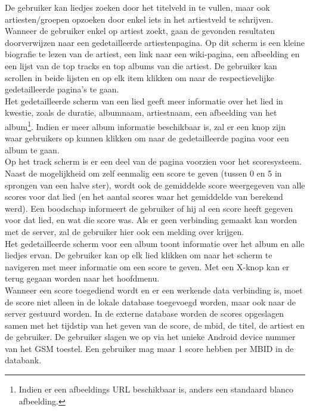 \documentclass[11pt,a4paper]{article}
\begin{document}
De gebruiker kan liedjes zoeken door het titelveld in te vullen, maar ook artiesten/groepen opzoeken door enkel iets in het artiestveld te schrijven. Wanneer de gebruiker enkel op artiest zoekt, gaan de gevonden resultaten doorverwijzen naar een gedetailleerde artiestenpagina. Op dit scherm is een kleine biografie te lezen van de artiest, een link naar een wiki-pagina, een afbeelding en een lijst van de top tracks en top albums van die artiest. De gebruiker kan scrollen in beide lijsten en op elk item klikken om naar de respectievelijke gedetailleerde pagina's te gaan.
\\

Het gedetailleerde scherm van een lied geeft meer informatie over het lied in kwestie, zoals de duratie, albumnaam, artiestnaam, een afbeelding van het album\footnote{Indien er een afbeeldings URL beschikbaar is, anders een standaard blanco afbeelding.}. Indien er meer album informatie beschikbaar is, zal er een knop zijn waar gebruikers op kunnen klikken om naar de gedetailleerde pagina voor een album te gaan. 
\\ 	

Op het track scherm is er een deel van de pagina voorzien voor het scoresysteem. Naast de mogelijkheid om zelf eenmalig een score te geven (tussen 0 en 5 in sprongen van een halve ster), wordt ook de gemiddelde score weergegeven van alle scores voor dat lied (en het aantal scores waar het gemiddelde van berekend werd). Een boodschap informeert de gebruiker of hij al een score heeft gegeven voor dat lied, en wat die score was. Als er geen verbinding gemaakt kan worden met de server, zal de gebruiker hier ook een melding over krijgen. 
\\ 
	
Het gedetailleerde scherm voor een album toont informatie over het album en alle liedjes ervan. De gebruiker kan op elk lied klikken om naar het scherm te navigeren met meer informatie om een score te geven. Met een X-knop kan er terug gegaan worden naar het hoofdmenu.
\\ 
	
Wanneer een score toegediend wordt en er een werkende data verbinding is, moet de score niet alleen in de lokale database toegevoegd worden, maar ook naar de server gestuurd worden. In de externe database worden de scores opgeslagen samen met het tijdstip van het geven van de score, de mbid, de titel, de artiest en de gebruiker. De gebruiker slagen we op via het unieke Android device nummer van het GSM toestel. Een gebruiker mag maar 1 score hebben per MBID in de databank.
\\
\end{document}
